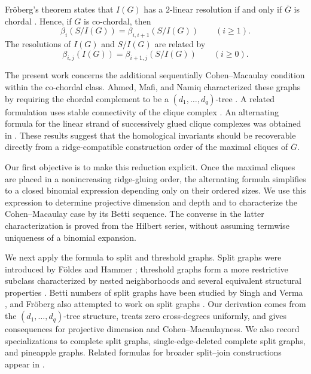 \documentclass[12pt, reqno]{amsart}
\theoremstyle{definition}
\numberwithin{equation}{section}
\begin{document}
Fr\"oberg's theorem states that $I(G)$ has a $2$-linear resolution if and only if $\overline G$ is chordal \cite{froeberg1990}.  Hence, if $G$ is co-chordal, then
\[
\beta_i(S/I(G))=\beta_{i,i+1}(S/I(G))\qquad(i\ge1).
\]
The resolutions of $I(G)$ and $S/I(G)$ are related by
\[
\beta_{i,j}(I(G))=\beta_{i+1,j}(S/I(G))
\qquad(i\ge0).
\]

The present work concerns the additional sequentially Cohen--Macaulay condition within the co-chordal class.  Ahmed, Mafi, and Namiq characterized these graphs by requiring the chordal complement to be a $(d_1,\ldots,d_q)$-tree \cite{ahmed2025}.  A related formulation uses stable connectivity of the clique complex \cite{namiq2026_icm}.  An alternating formula for the linear strand of successively glued clique complexes was obtained in \cite{namiq2026_explicit}.  These results suggest that the homological invariants should be recoverable directly from a ridge-compatible construction order of the maximal cliques of $\overline G$.

Our first objective is to make this reduction explicit.  Once the maximal cliques are placed in a nonincreasing ridge-gluing order, the alternating formula simplifies to a closed binomial expression depending only on their ordered sizes.  We use this expression to determine projective dimension and depth and to characterize the Cohen--Macaulay case by its Betti sequence.  The converse in the latter characterization is proved from the Hilbert series, without assuming termwise uniqueness of a binomial expansion.

We next apply the formula to split and threshold graphs.  Split graphs were introduced by F\"oldes and Hammer \cite{foldes1977}; threshold graphs form a more restrictive subclass characterized by nested neighborhoods and several equivalent structural properties \cite{chvatal1977,hammer_ibaraki1981,mahadev1995}.  Betti numbers of split graphs have been studied by Singh and Verma \cite{singh2020}, and Fr\"oberg also attempted to work on split graphs \cite{froeberg2026}.  Our derivation comes from the $(d_1,\ldots,d_q)$-tree structure, treats zero cross-degrees uniformly, and gives consequences for projective dimension and Cohen--Macaulayness.  We also record specializations to complete split graphs, single-edge-deleted complete split graphs, and pineapple graphs.  Related formulas for broader split--join constructions appear in \cite{rather2026_splitjoin}.
\end{document}
